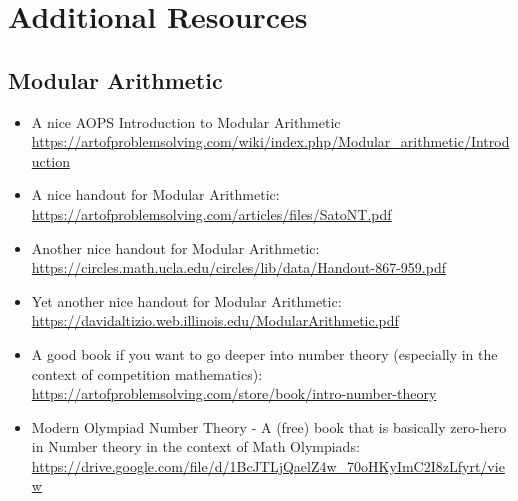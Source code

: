 \chapter{Additional Resources}

\section{Modular Arithmetic}
\begin{itemize}
    \item A nice AOPS Introduction to Modular Arithmetic \url{https://artofproblemsolving.com/wiki/index.php/Modular_arithmetic/Introduction}
    \item A nice handout for Modular Arithmetic: \url{https://artofproblemsolving.com/articles/files/SatoNT.pdf}
    \item Another  nice handout for Modular Arithmetic: \url{https://circles.math.ucla.edu/circles/lib/data/Handout-867-959.pdf}
    \item Yet another nice handout for Modular Arithmetic: \url{https://davidaltizio.web.illinois.edu/ModularArithmetic.pdf}
    \item A good book if you want to go deeper into number theory (especially in the context of competition mathematics): \url{https://artofproblemsolving.com/store/book/intro-number-theory}
    \item Modern Olympiad Number Theory - A (free) book that is basically zero-hero in Number theory in the context of Math Olympiads: \url{https://drive.google.com/file/d/1BcJTLjQaelZ4w_70oHKyImC2I8zLfyrt/view}
\end{itemize}

